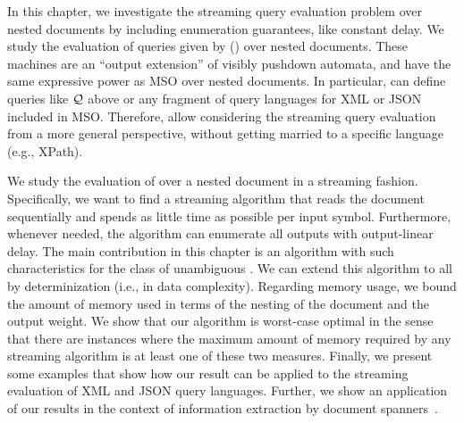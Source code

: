 In this chapter, we investigate the streaming query evaluation problem over nested documents by including enumeration guarantees, like constant delay. We study the evaluation of queries given by \vpannnames (\vpanns) over nested documents.  These machines are an ``output extension'' of visibly pushdown automata, %
{and have the same expressive power as MSO over nested documents. 
In particular, \vpanns can define queries like $\mathcal{Q}$ above or any fragment of query languages for XML or JSON included in MSO.}
Therefore, \vpanns allow considering the streaming query evaluation from a more general perspective, without getting married to a specific language (e.g., XPath). 

We study the evaluation of \vpann over a nested document in a streaming fashion. Specifically, we want to find a streaming algorithm that reads the document sequentially and spends as little time as possible per input symbol. 
Furthermore, whenever needed, the algorithm can enumerate all outputs with output-linear delay. %
The main contribution in this chapter is an algorithm with such characteristics for the class of unambiguous \vpanns. We can extend this algorithm to all \vpanns by determinization (i.e., in data complexity). 
Regarding memory usage, we bound the amount of memory used in terms of the nesting of the document and the output weight. We show that our algorithm is worst-case optimal in the sense that there are instances where the maximum amount of memory required by any streaming algorithm is at least one of these two measures.
Finally, we present some examples that show how our result can be applied to the streaming evaluation of XML and JSON query languages.
Further, we show an application of our results in the context of information extraction by document spanners~\cite{FaginKRV15}.


